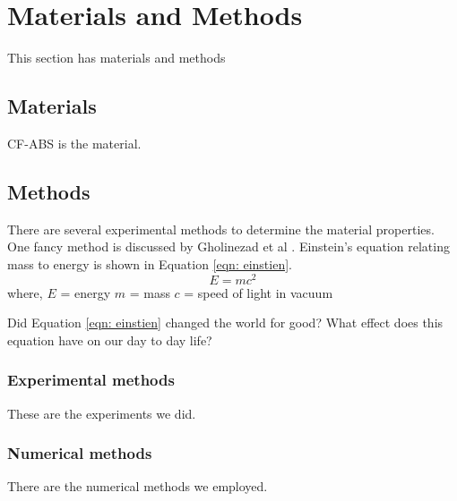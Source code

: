 
\section{Materials and Methods}
This section has materials and methods
\subsection{Materials}
CF-ABS is the material.
\subsection{Methods}
There are several experimental methods to determine the material properties. One fancy method is discussed by Gholinezad et al \cite{gholinezhad2022non}.
Einstein's equation relating mass to energy is shown in Equation \ref{eqn: einstien}.
\begin{equation}
                                                   \label{eqn: einstien}
                                                   E = mc^2
                                                   \end{equation}
\newline
where,\newline
$E$ = energy\newline
$m$ = mass\newline
$c$ = speed of light in vacuum \newline

Did Equation \ref{eqn: einstien} changed the world for good? What effect does this equation have on our day to day life?

\subsubsection{Experimental methods}
These are the experiments we did.

\subsubsection{Numerical methods}
There are the numerical methods we employed.

